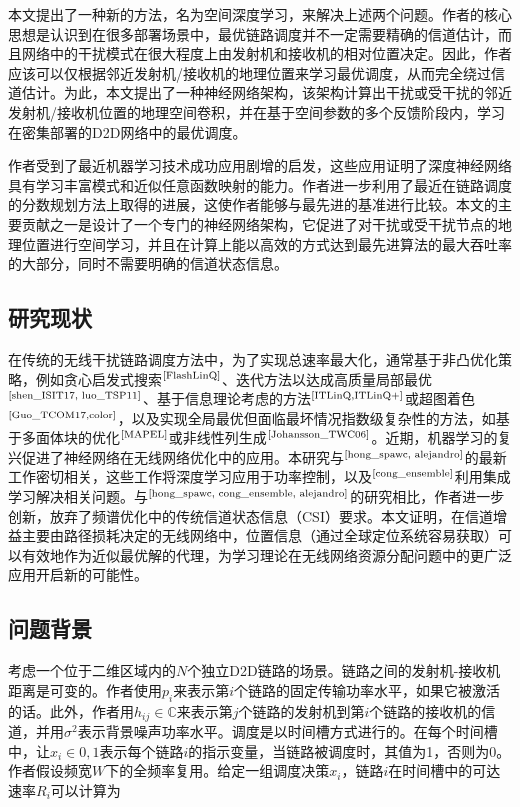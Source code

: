 \documentclass[UTF8, 12pt]{article}
\numberwithin{figure}{section}
\newcommand{\upcite}[1]{$^{\scriptsize \cite{#1}}$}
\begin{document}
本文提出了一种新的方法，名为空间深度学习，来解决上述两个问题。作者的核心思想是认识到在很多部署场景中，最优链路调度并不一定需要精确的信道估计，而且网络中的干扰模式在很大程度上由发射机和接收机的相对位置决定。因此，作者应该可以仅根据邻近发射机/接收机的地理位置来学习最优调度，从而完全绕过信道估计。为此，本文提出了一种神经网络架构，该架构计算出干扰或受干扰的邻近发射机/接收机位置的地理空间卷积，并在基于空间参数的多个反馈阶段内，学习在密集部署的D2D网络中的最优调度。

作者受到了最近机器学习技术成功应用剧增的启发，这些应用证明了深度神经网络具有学习丰富模式和近似任意函数映射的能力。作者进一步利用了最近在链路调度的分数规划方法上取得的进展，这使作者能够与最先进的基准进行比较。本文的主要贡献之一是设计了一个专门的神经网络架构，它促进了对干扰或受干扰节点的地理位置进行空间学习，并且在计算上能以高效的方式达到最先进算法的最大吞吐率的大部分，同时不需要明确的信道状态信息。

\subsection{研究现状}

在传统的无线干扰链路调度方法中，为了实现总速率最大化，通常基于非凸优化策略，例如贪心启发式搜索\upcite{FlashLinQ}、迭代方法以达成高质量局部最优\upcite{shen_ISIT17, luo_TSP11}、基于信息理论考虑的方法\upcite{ITLinQ,ITLinQ+}或超图着色\upcite{Guo_TCOM17,color}，以及实现全局最优但面临最坏情况指数级复杂性的方法，如基于多面体块的优化\upcite{MAPEL}或非线性列生成\upcite{Johansson_TWC06}。近期，机器学习的复兴促进了神经网络在无线网络优化中的应用。本研究与\upcite{hong_spawc, alejandro}的最新工作密切相关，这些工作将深度学习应用于功率控制，以及\upcite{cong_ensemble}利用集成学习解决相关问题。与\upcite{hong_spawc, cong_ensemble, alejandro}的研究相比，作者进一步创新，放弃了频谱优化中的传统信道状态信息（CSI）要求。本文证明，在信道增益主要由路径损耗决定的无线网络中，位置信息（通过全球定位系统容易获取）可以有效地作为近似最优解的代理，为学习理论在无线网络资源分配问题中的更广泛应用开启新的可能性。

\subsection{问题背景}

考虑一个位于二维区域内的$N$个独立D2D链路的场景。链路之间的发射机-接收机距离是可变的。作者使用$p_i$来表示第$i$个链路的固定传输功率水平，如果它被激活的话。此外，作者用$h_{ij}\in\mathbb C$来表示第$j$个链路的发射机到第$i$个链路的接收机的信道，并用$\sigma^2$表示背景噪声功率水平。调度是以时间槽方式进行的。在每个时间槽中，让$x_i\in{0,1}$表示每个链路$i$的指示变量，当链路被调度时，其值为1，否则为0。作者假设频宽$W$下的全频率复用。给定一组调度决策$x_i$，链路$i$在时间槽中的可达速率$R_i$可以计算为
\end{document}
